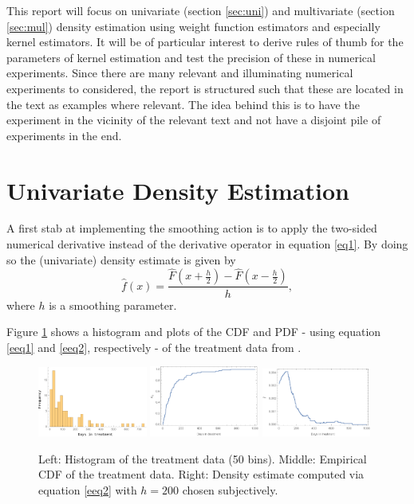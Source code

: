 \documentclass[
twoside,
openright,
titlepage,
numbers=noenddot,
headinclude,%
footinclude=true,
dottedtoc, %
ngerman,
american, %
pagesize=pdftex,
]{book}
\begin{document}
	\newline
	This report will focus on univariate (section \eqref{sec:uni}) and multivariate (section \ref{sec:mul}) density estimation using weight function estimators and especially kernel estimators. It will be of particular interest to derive rules of thumb for the parameters of kernel estimation and test the precision of these in numerical experiments. Since there are many relevant and illuminating numerical experiments to considered, the report is structured such that these are located in the text as examples where relevant. The idea behind this is to have the experiment in the vicinity of the relevant text and not have a disjoint pile of experiments in the end.
	
	\section{Univariate Density Estimation}
	\label{sec:uni}
	\noindent A first stab at implementing the smoothing action is to apply the two-sided numerical derivative instead of the derivative operator in equation \eqref{eq1}. By doing so the (univariate) density estimate is given by
	\begin{equation}
		\hat{f}(x)=\frac{\hat{F}(x+\frac{h}{2})-\hat{F}(x-\frac{h}{2})}{h},
		\label{eeq2}
	\end{equation} 
	where $h$ is a smoothing parameter.
	\begin{example}
		\noindent Figure \ref{fig:1a} shows a histogram and plots of the CDF and PDF - using equation \eqref{eeq1} and \eqref{eeq2}, respectively - of the treatment data from \citet{Silverman86}.
		
		\begin{figure}[H]
			\centering
			\captionsetup{width=0.95\textwidth}
			\includegraphics[width=0.32\textwidth]{figures/P3.pdf}
			\includegraphics[width=0.32\textwidth]{figures/P4.pdf}
			\includegraphics[width=0.32\textwidth]{figures/P5.pdf}
			\caption
			{Left: Histogram of the treatment data (50 bins). Middle: Empirical CDF of the treatment data. Right: Density estimate computed via equation \eqref{eeq2} with $h=200$ chosen subjectively.}
			\label{fig:1a}
		\end{figure}
	\end{example}
\end{document}
